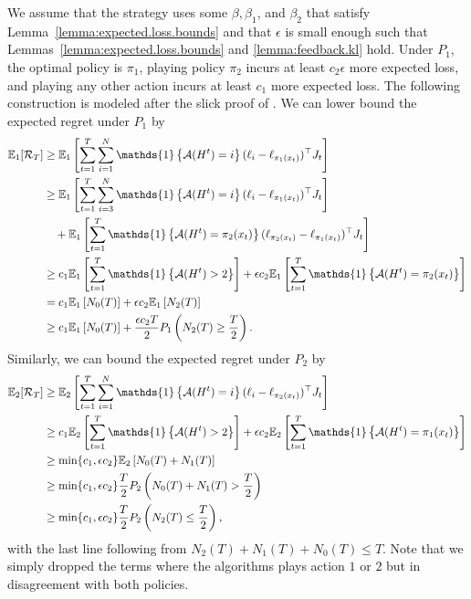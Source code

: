 \documentclass{article}
\newcommand{\regret}{\mathcal{R}}
\begin{document}
We assume that the strategy uses some $\beta,\beta_1$, and $\beta_2$ that satisfy Lemma~\ref{lemma:expected.loss.bounds} and that $\epsilon$ is small enough such that Lemmas~\ref{lemma:expected.loss.bounds} and \ref{lemma:feedback.kl} hold. Under $P_1$, the optimal policy is $\pi_1$, playing policy $\pi_2$ incurs at least $c_2 \epsilon$ more expected loss, and playing any other action incurs at least $c_1$ more expected loss. The following construction is modeled after the slick proof of \citet{lattimore2018cleaning}. We can lower bound the expected regret under $P_1$ by
\begin{align*}
  \ex_1[\regret_T]
  &\geq
    \ex_1\left[ \sum_{t=1}^T\sum_{i=1}^N
    \mathds{1}\left\{ \mathcal A(H^t) = i \right\}
    (\ell_i - \ell_{\pi_1(x_t)})^\top J_t
    \right]\\
  &\geq
    \ex_1\left[ \sum_{t=1}^T\sum_{i=3}^N
    \mathds{1}\left\{ \mathcal A(H^t) = i \right\}
    (\ell_i - \ell_{\pi_1(x_t)})^\top J_t\right]\\
    &\quad +\ex_1\left[\sum_{t=1}^T
    \mathds{1}\left\{ \mathcal A(H^t) = \pi_2(x_t) \right\}    
    (\ell_{\pi_2(x_t)} - \ell_{\pi_1(x_t)})^\top J_t
    \right]\\
  &\geq
    c_1\ex_1\left[ \sum_{t=1}^T\mathds{1}\left\{ \mathcal A(H^t) > 2 \right\}
    \right]
    +
    \epsilon c_2 \ex_1\left[\sum_{t=1}^T\mathds{1}\left\{ \mathcal A(H^t) = \pi_2(x_t) \right\}\right]\\
  &=
    c_1\ex_1\left[N_0(T)\right]
    +
    \epsilon c_2 \ex_1\left[N_2(T)\right]\\
  &\geq
    c_1\ex_1\left[N_0(T)\right]
    + \frac{\epsilon c_2 T}{2}
    P_1\left(N_2(T)\geq \frac{T}{2}\right).
\end{align*}
Similarly, we can bound the expected regret under $P_2$ by 
\begin{align*}
  \ex_2[\regret_T]
  &\geq
    \ex_2\left[ \sum_{t=1}^T
    \sum_{i=1}^N
    \mathds{1}\left\{ \mathcal A(H^t) = i \right\}    
    (\ell_i - \ell_{\pi_2(x_t)})^\top J_t
    \right]\\
  &\geq
    c_1\ex_2\left[ \sum_{t=1}^T\mathds{1}\left\{ \mathcal A(H^t) > 2 \right\}
    \right]
    +
    \epsilon c_2 \ex_2\left[\sum_{t=1}^T\mathds{1}\left\{ \mathcal A(H^t) = \pi_1(x_t) \right\}\right]\\
  &\geq
    \min\{ c_1,\epsilon c_2\}
    \ex_2\left[N_0(T) + N_1(T)\right]\\
  &\geq
    \min\{ c_1,\epsilon c_2\}\frac{T}{2}
    P_2\left(N_0(T) + N_1(T)>\frac{T}{2}\right)\\
  &\geq
    \min\{ c_1,\epsilon c_2\}\frac{T}{2}
    P_2\left(N_2(T)\leq\frac{T}{2}\right),
\end{align*}
with the last line following from $N_2(T) + N_1(T) + N_0(T) \leq T$.
Note that  we simply dropped the terms where the algorithms plays action $1$ or $2$ but in disagreement with both policies.
\end{document}
